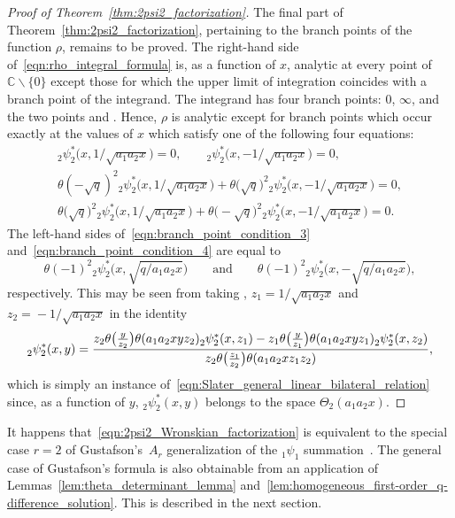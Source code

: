 \documentclass[pdftex]{sigma}
\numberwithin{equation}{section}
\newcommand{\C}{\mathbb{C}}
\begin{document}
\begin{proof}[Proof of Theorem~\ref{thm:2psi2_factorization}]
The final part of Theorem~\ref{thm:2psi2_factorization}, pertaining to the branch points of the function $\rho$, remains to be proved. The right-hand side of~\eqref{eqn:rho_integral_formula} is, as a function of $x$, analytic at every point of~${\C \backslash \{0\}}$ except those for which the upper limit of integration coincides with a branch point of the integrand. The integrand has four branch points: $0$, $\infty$, and the two points  and . Hence, $\rho$ is analytic except for branch points which occur exactly at the values of $x$ which satisfy one of the following four equations:
\begin{gather}
_2^{}\psi_2^\ast\bigl(x,1/\sqrt{a_1a_2x}\bigr) = 0, \qquad
_2^{}\psi_2^\ast\bigl(x,-1/\sqrt{a_1a_2x}\bigr) = 0, \nonumber \\
\theta(-\sqrt{q})^2 {}_2^{}\psi_2^\ast\bigl(x,1/\sqrt{a_1a_2x}\bigr) + \theta\bigl(\sqrt{q}\bigr)^2 {}_2^{}\psi_2^\ast\bigl(x,-1/\sqrt{a_1a_2x}\bigr) = 0, \label{eqn:branch_point_condition_3} \\
\theta\bigl(\sqrt{q}\bigr)^2 {}_2^{}\psi_2^\ast\bigl(x,1/\sqrt{a_1a_2x}\bigr) + \theta\bigl(-\sqrt{q}\bigr)^2 {}_2^{}\psi_2^\ast\bigl(x,-1/\sqrt{a_1a_2x}\bigr) = 0. \label{eqn:branch_point_condition_4}
\end{gather}
The left-hand sides of~\eqref{eqn:branch_point_condition_3} and~\eqref{eqn:branch_point_condition_4} are equal to
\[ \theta(-1)^2{}_2^{}\psi_2^\ast\bigl(x,\sqrt{q/a_1a_2x}\bigr) \qquad \text{and} \qquad \theta(-1)^2{}_2^{}\psi_2^\ast\bigl(x,-\sqrt{q/a_1a_2x}\bigr), \]
respectively. This may be seen from taking , $z_1=1/\!\sqrt{a_1a_2x}$ and $z_2=\!-1/\!\sqrt{a_1a_2x}$ in the identity
\[ _2^{}\psi_2^\ast(x,y) = {z_2\theta\bigl({y \over z_2}\bigr) \theta(a_1a_2xyz_2) {}_2^{}\psi_2^\ast(x,z_1) - z_1\theta\bigl({y \over z_1}\bigr) \theta(a_1a_2xyz_1) {}_2^{}\psi_2^\ast(x,z_2) \over z_2\theta\bigl({z_1 \over z_2}\bigr) \theta(a_1a_2xz_1z_2)}, \]
which is simply an instance of~\eqref{eqn:Slater_general_linear_bilateral_relation} since, as a function of $y$, $_2^{}\psi_2^\ast(x,y)$ belongs to the space $\Theta_2(a_1a_2x)$.
\end{proof}

\begin{Remark}\label{rmk:Gustafson_equivalence}
It happens that~\eqref{eqn:2psi2_Wronskian_factorization} is equivalent to the special case $r=2$ of Gustafson's~$A_r$ generalization of the $_1\psi_1$ summation~\cite[Theorem~1.17]{Gustafson1987}. The general case of Gustafson's formula is also obtainable from an application of Lemmas~\ref{lem:theta_determinant_lemma} and~\ref{lem:homogeneous_first-order_q-difference_solution}. This is described in the next section.
\end{Remark}
\end{document}
